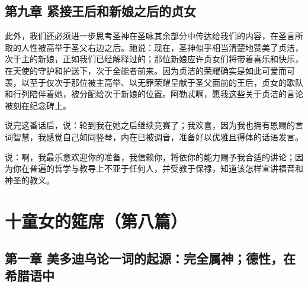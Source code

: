 
\subsection{第九章 紧接王后和新娘之后的贞女}

此外，我们还必须进一步思考圣神在圣咏其余部分中传达给我们的内容，在圣言所取的人性被高举于圣父右边之后。祂说：现在，圣神似乎相当清楚地赞美了贞洁，次于主的新娘，正如我们已经解释过的；那位新娘应许贞女们将带着喜乐和快乐，在天使的守护和护送下，次于全能者前来。因为贞洁的荣耀确实是如此可爱而可羡，以至于仅次于那位被主高举、以无罪荣耀呈献于圣父面前的王后，贞女的歌队和行列陪伴着她，被分配给次于新娘的位置。阿勒忒啊，愿我这些关于贞洁的言论被刻在纪念碑上。\par

说完这番话后，说：轮到我在她之后继续竞赛了；我欢喜，因为我也拥有恩赐的言词智慧，我感觉自己如同竖琴，内在已被调音，准备好以优雅且得体的话语发言。\par

说：啊，我最乐意欢迎你的准备，我信赖你，将依你的能力赐予我合适的讲论；因为你在普遍的哲学与教导上不亚于任何人，并受教于保禄，知道该怎样宣讲福音和神圣的教义。\par



\section{十童女的筵席（第八篇）}

\par


\subsection{第一章 美多迪乌论一词的起源：完全属神；德性，在希腊语中}

